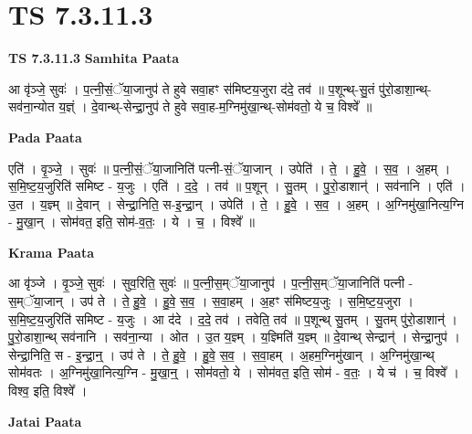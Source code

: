 \documentclass[17pt]{extarticle}
\begin{document}
\section{ TS 7.3.11.3 }

\textbf{TS 7.3.11.3 } \newline
\textbf{Samhita Paata} \newline

आ वृ॑ञ्जे॒ सुवः॑ । प॒त्नी॒सं॒ॅया॒जानुप॑ ते हुवे सवा॒हꣳ स॑मिष्टय॒जुरा द॑दे॒ तव॑ ॥ प॒शून्थ्-सु॒तं पु॑रो॒डाशा॒न्थ्-सव॑ना॒न्योत य॒ज्ञ्ं । दे॒वान्थ्-सेन्द्रा॒नुप॑ ते हुवे सवा॒ह-म॒ग्निमु॑खा॒न्थ्-सोम॑वतो॒ ये च॒ विश्वे᳚ ॥ \newline

\textbf{Pada Paata} \newline

एति॑ । वृ॒ञ्जे॒ । सुवः॑ ॥ प॒त्नी॒सं॒ॅया॒जानिति॑ पत्नी-सं॒ॅया॒जान् । उपेति॑ । ते॒ । हु॒वे॒ । स॒व॒ । अ॒हम् । स॒मि॒ष्ट॒य॒जुरिति॑ समिष्ट - य॒जुः । एति॑ । द॒दे॒ । तव॑ ॥ प॒शून् । सु॒तम् । पु॒रो॒डाशान्॑ । सव॑नानि । एति॑ । उ॒त । य॒ज्ञ्म् ॥ दे॒वान् । सेन्द्रा॒निति॒ स-इ॒न्द्रा॒न् । उपेति॑ । ते॒ । हु॒वे॒ । स॒व॒ । अ॒हम् । अ॒ग्निमु॑खा॒नित्य॒ग्नि - मु॒खा॒न् । सोम॑वत॒ इति॒ सोम॑-व॒तः॒ । ये । च॒ । विश्वे᳚ ॥  \newline


\textbf{Krama Paata} \newline

आ वृ॑ञ्जे । वृ॒ञ्जे॒ सुवः॑ । सुव॒रिति॒ सुवः॑ ॥ प॒त्नी॒स॒म्ॅया॒जानुप॑ । प॒त्नी॒स॒म्ॅया॒जानिति॑ पत्नी - स॒म्ॅया॒जान् । उप॑ ते । ते॒ हु॒वे॒ । हु॒वे॒ स॒व॒ । स॒वा॒हम् । अ॒हꣳ स॑मिष्टय॒जुः । स॒मि॒ष्ट॒य॒जुरा । स॒मि॒ष्ट॒य॒जुरिति॑ समिष्ट - य॒जुः । आ द॑दे । द॒दे॒ तव॑ । तवेति॒ तव॑ ॥ प॒शून्थ् सु॒तम् । सु॒तम् पु॑रो॒डाशान्॑ । पु॒रो॒डाशा॒न्थ् सव॑नानि । सव॑ना॒न्या । ओत । उ॒त य॒ज्ञ्म् । य॒ज्ञ्मिति॑ य॒ज्ञ्म् ॥ दे॒वान्थ् सेन्द्रान्॑ । सेन्द्रा॒नुप॑ । सेन्द्रा॒निति॒ स - इ॒न्द्रा॒न्॒ । उप॑ ते । ते॒ हु॒वे॒ । हु॒वे॒ स॒व॒ । स॒वा॒हम् । अ॒हम॒ग्निमु॑खान् । अ॒ग्निमु॑खा॒न्थ् सोम॑वतः । अ॒ग्निमु॑खा॒नित्य॒ग्नि - मु॒खा॒न्॒ । सोम॑वतो॒ ये । सोम॑वत॒ इति॒ सोम॑ - व॒तः॒ । ये च॑ । च॒ विश्वे᳚ । विश्व॒ इति॒ विश्वे᳚ । \newline

\textbf{Jatai Paata} \newline
\end{document}
